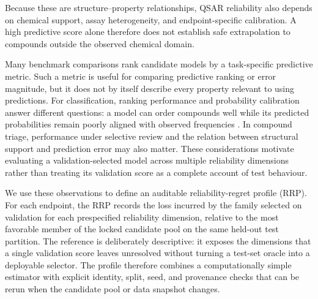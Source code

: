 \documentclass[
]{article}
\begin{document}
Because these are structure--property relationships, QSAR reliability also
depends on chemical support, assay heterogeneity, and endpoint-specific
calibration. A high predictive score alone therefore does not establish safe
extrapolation to compounds outside the observed chemical domain.

Many benchmark comparisons rank candidate models by a task-specific
predictive metric. Such a metric is useful for comparing predictive
ranking or error magnitude, but it does not by itself describe every
property relevant to using predictions. For classification, ranking
performance and probability calibration answer different questions: a
model can order compounds well while its predicted probabilities remain
poorly aligned with observed frequencies \cite{guo2017calibration}. In compound triage,
performance under selective review and the relation between structural
support and prediction error may also matter. These considerations
motivate evaluating a validation-selected model across multiple
reliability dimensions rather than treating its validation score as a
complete account of test behaviour.

We use these observations to define an auditable reliability-regret
profile (RRP). For each endpoint, the RRP records the loss incurred by the
family selected on validation for each prespecified reliability dimension,
relative to the most favorable member of the locked candidate pool on the
same held-out test partition. The reference is deliberately descriptive:
it exposes the dimensions that a single validation score leaves unresolved
without turning a test-set oracle into a deployable selector. The profile
therefore combines a computationally simple estimator with explicit
identity, split, seed, and provenance checks that can be rerun when the
candidate pool or data snapshot changes.
\end{document}
